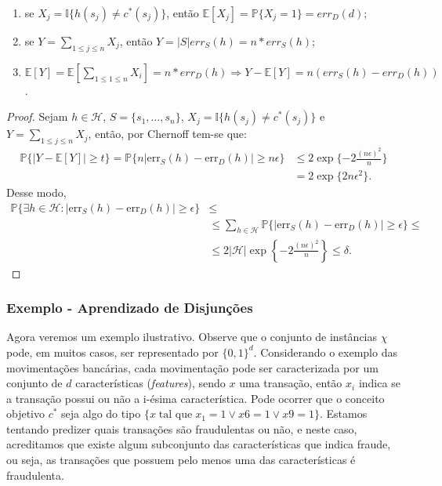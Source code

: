 \begin{enumerate}
    \item se $X_j = \mathbb{I}\{h(s_j) \neq c^*(s_j)\}$, então $\mathbb{E}[X_j] = \mathbb{P}\{X_j = 1\} = err_D(d)$;
    \item se $Y = \sum_{1 \leq j \leq n}{X_j}$, então $Y = |S|err_S(h) = n*err_S(h)$;
    \item $\mathbb{E}[Y] = \mathbb{E}[\sum_{1 \leq 1 \leq n}{X_i}] = n * err_D(h) \Rightarrow Y - \mathbb{E}[Y] = n(err_S(h) - err_D(h))$.
\end{enumerate}{}
\begin{proof}
Sejam $h \in \mathcal{H}$, $S = \{s_1, \dots, s_n\}$, $X_j = \mathbb{I}\{h(s_j) \neq c^*(s_j)\}$ e $Y = \sum_{1 \leq j \leq n}{X_j}$, então, por Chernoff tem-se que:
\begin{align*}
    \mathbb{P}\{|Y - \mathbb{E}[Y]| \geq t\} = \mathbb{P}\{n|\mathrm{err}_S(h) - \mathrm{err}_D(h)| \geq n\epsilon\} &\leq 2\exp\{-2\frac{(n\epsilon)^2}{n}\} \\
    &= 2\exp\{2n\epsilon^2\}.
\end{align*}
Desse modo,
\begin{align*}
    \mathbb{P}\{\exists h \in \mathcal{H} : |\mathrm{err}_S(h) - \mathrm{err}_D(h)| \geq \epsilon\} & \leq \\
    &\leq \sum_{h \in \mathcal{H}}\mathbb{P}\{|\mathrm{err}_S(h) - \mathrm{err}_D(h)| \geq \epsilon\} \leq \\
    &\leq 2|\mathcal{H}|\exp\left\{-2\frac{(n\epsilon)^2}{n}\right\} \leq \delta.
\end{align*}{}
\end{proof}

\subsubsection{Exemplo - Aprendizado de Disjunções}

Agora veremos um exemplo ilustrativo. Observe que o conjunto de instâncias $\chi$ pode, em muitos casos, ser representado por $\{0,1\}^d$. Considerando o exemplo das movimentações bancárias, cada movimentação pode ser caracterizada por um conjunto de $d$ características (\emph{features}), sendo $x$ uma transação, então $x_i$ indica se a transação possui ou não a i-ésima característica. Pode ocorrer que o conceito objetivo $c^*$ seja algo do tipo $\{x \; \text{tal que} \; x_1 = 1 \vee x6 = 1 \vee x9 = 1\}$. Estamos tentando predizer quais transações são fraudulentas ou não, e neste caso, acreditamos que existe algum subconjunto das características que indica fraude, ou seja, as transações que possuem pelo menos uma das características é fraudulenta.

